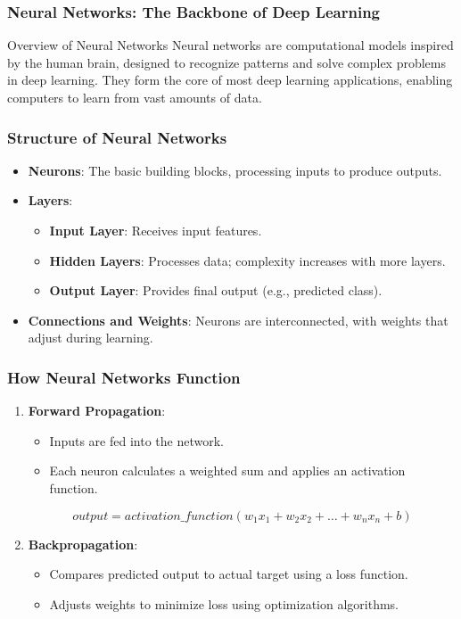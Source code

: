 \documentclass[aspectratio=169]{beamer}
\begin{document}
\begin{frame}
    \frametitle{Neural Networks: The Backbone of Deep Learning}
    \begin{block}{Overview of Neural Networks}
        Neural networks are computational models inspired by the human brain, designed to recognize patterns and solve complex problems in deep learning. They form the core of most deep learning applications, enabling computers to learn from vast amounts of data.
    \end{block}
\end{frame}

\begin{frame}
    \frametitle{Structure of Neural Networks}
    \begin{itemize}
        \item \textbf{Neurons}: The basic building blocks, processing inputs to produce outputs.
        \item \textbf{Layers}:
            \begin{itemize}
                \item \textbf{Input Layer}: Receives input features.
                \item \textbf{Hidden Layers}: Processes data; complexity increases with more layers.
                \item \textbf{Output Layer}: Provides final output (e.g., predicted class).
            \end{itemize}
        \item \textbf{Connections and Weights}: Neurons are interconnected, with weights that adjust during learning.
    \end{itemize}
\end{frame}

\begin{frame}
    \frametitle{How Neural Networks Function}
    \begin{enumerate}
        \item \textbf{Forward Propagation}:
            \begin{itemize}
                \item Inputs are fed into the network.
                \item Each neuron calculates a weighted sum and applies an activation function.
            \end{itemize}
            \begin{equation}
                output = activation\_function(w_1 x_1 + w_2 x_2 + \ldots + w_n x_n + b)
            \end{equation}
        \item \textbf{Backpropagation}:
            \begin{itemize}
                \item Compares predicted output to actual target using a loss function.
                \item Adjusts weights to minimize loss using optimization algorithms.
            \end{itemize}
    \end{enumerate}
\end{frame}
\end{document}
